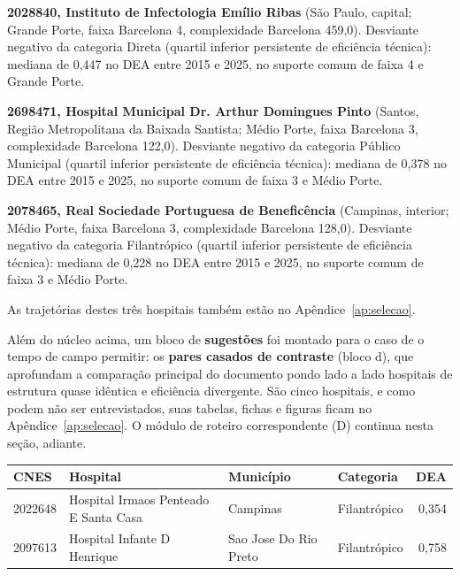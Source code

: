 \noindent\textbf{2028840, Instituto de Infectologia Emílio Ribas} (São Paulo, capital; Grande Porte, faixa Barcelona 4, complexidade Barcelona 459,0). Desviante negativo da categoria Direta (quartil inferior persistente de eficiência técnica): mediana de 0,447 no DEA entre 2015 e 2025, no suporte comum de faixa 4 e Grande Porte.\par\medskip
\noindent\textbf{2698471, Hospital Municipal Dr. Arthur Domingues Pinto} (Santos, Região Metropolitana da Baixada Santista; Médio Porte, faixa Barcelona 3, complexidade Barcelona 122,0). Desviante negativo da categoria Público Municipal (quartil inferior persistente de eficiência técnica): mediana de 0,378 no DEA entre 2015 e 2025, no suporte comum de faixa 3 e Médio Porte.\par\medskip
\newpage
\noindent\textbf{2078465, Real Sociedade Portuguesa de Beneficência} (Campinas, interior; Médio Porte, faixa Barcelona 3, complexidade Barcelona 128,0). Desviante negativo da categoria Filantrópico (quartil inferior persistente de eficiência técnica): mediana de 0,228 no DEA entre 2015 e 2025, no suporte comum de faixa 3 e Médio Porte.\par\medskip

\noindent As trajetórias destes três hospitais também estão no
Apêndice~\ref{ap:selecao}.


Além do núcleo acima, um bloco de \textbf{sugestões} foi montado
para o caso de o tempo de campo permitir: os \textbf{pares casados de
contraste} (bloco d), que aprofundam a comparação principal do
documento pondo lado a lado hospitais de estrutura quase idêntica e
eficiência divergente. São cinco hospitais, e como podem não ser
entrevistados, suas tabelas, fichas e figuras ficam no
Apêndice~\ref{ap:selecao}. O módulo de roteiro correspondente (D)
continua nesta seção, adiante.


\begin{center}\small
\begin{tabular}{llllr}
\toprule
CNES & Hospital & Município & Categoria & DEA \\
\midrule
2022648 & Hospital Irmaos Penteado E Santa Casa  & Campinas & Filantrópico & 0,354 \\
2097613 & Hospital Infante D Henrique & Sao Jose Do Rio Preto & Filantrópico & 0,758 \\
\bottomrule
\end{tabular}
\end{center}

